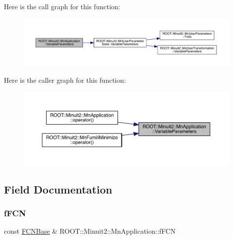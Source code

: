 Here is the call graph for this function\+:
\nopagebreak
\begin{figure}[H]
\begin{center}
\leavevmode
\includegraphics[width=350pt]{df/dd5/classROOT_1_1Minuit2_1_1MnApplication_afc0ad887758b1609cbcae1c8b6a5a467_cgraph}
\end{center}
\end{figure}
Here is the caller graph for this function\+:
\nopagebreak
\begin{figure}[H]
\begin{center}
\leavevmode
\includegraphics[width=350pt]{df/dd5/classROOT_1_1Minuit2_1_1MnApplication_afc0ad887758b1609cbcae1c8b6a5a467_icgraph}
\end{center}
\end{figure}


\subsection{Field Documentation}
\mbox{\label{classROOT_1_1Minuit2_1_1MnApplication_a3ea713844ff160f58da7e7d7897769fa}} 
\subsubsection{\texorpdfstring{fFCN}{fFCN}}
{\footnotesize\ttfamily const \mbox{\hyperlink{classROOT_1_1Minuit2_1_1FCNBase}{F\+C\+N\+Base}} \& R\+O\+O\+T\+::\+Minuit2\+::\+Mn\+Application\+::f\+F\+CN\hspace{0.3cm}{\ttfamily [protected]}}

